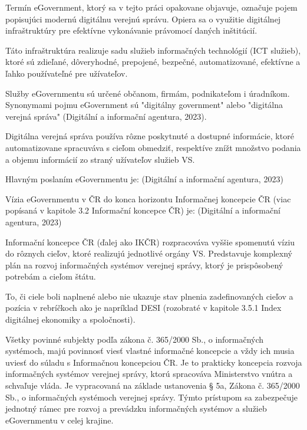 Termín eGovernment,  ktorý sa v tejto práci opakovane objavuje, označuje pojem popisujúci modernú digitálnu verejnú správu. Opiera sa o využitie digitálnej infraštruktúry pre efektívne vykonávanie právomocí daných inštitúcií. 

Táto infraštruktúra realizuje sadu služieb informačných technológií (ICT služieb), ktoré sú zdieľané, dôveryhodné, prepojené, bezpečné, automatizované, efektívne a ľahko používateľné pre užívateľov. 

Služby eGovernmentu sú určené občanom, firmám, podnikateľom i úradníkom. Synonymami pojmu eGovernment sú "digitálny government" alebo "digitálna verejná správa" \scr(Digitální a informační agentura, 2023).

Digitálna verejná správa používa rôzne poskytnuté a dostupné informácie, ktoré automatizovane spracuváva s cieľom obmedziť, respektíve znížt množstvo podania a objemu informácií zo straný užívateľov služieb VS.

Hlavným poslaním eGovernmentu je:  \scr(Digitální a informační agentura, 2023)

Vízia eGovernmentu v ČR do konca horizontu Informačnej koncepcie ČR (viac popísaná v kapitole 3.2 Informační koncepce ČR) je:  \scr(Digitální a informační agentura, 2023)

Informační koncepce ČR (ďalej ako IKČR) rozpracováva vyššie spomenutú víziu do rôznych cieľov, ktoré realizujú jednotlivé orgány VS. Predstavuje komplexný plán na rozvoj informačných systémov verejnej správy, ktorý je prispôsobený potrebám a cieľom štátu.

To, či ciele boli naplnené alebo nie ukazuje stav plnenia zadefinovaných cieľov a pozícia v rebríčkoch ako je napríklad DESI (rozobraté v kapitole 3.5.1 Index digitálnej ekonomiky a spoločnosti).

Všetky povinné subjekty podľa zákona  č. 365/2000 Sb., o informačných systémoch, majú povinnosť viesť vlastné informačné koncepcie a vždy ich musia uviesť do súladu s Informačnou koncepciou ČR. Je to prakticky koncepcia rozvoja informačných systémov verejnej správy, ktorú spracováva Ministerstvo vnútra a schvaľuje vláda. Je vypracovaná na základe ustanovenia § 5a, Zákona č. 365/2000 Sb., o informačných systémoch verejnej správy. Týmto prístupom sa zabezpečuje jednotný rámec pre rozvoj a prevádzku informačných systémov a služieb eGovernmentu v celej krajine.


